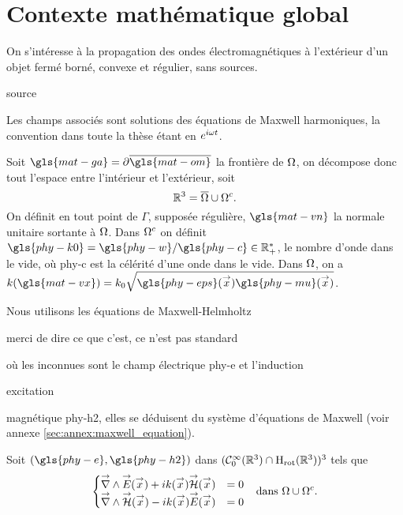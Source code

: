 \chapter{Contexte mathématique global}

\label{sec:context_math}
\minitoc
\newpage

On s’intéresse à la propagation des ondes électromagnétiques à l'extérieur d'un objet fermé borné, convexe et régulier, sans sources. 
\begin{REM}
  source
\end{REM}
Les champs associés sont solutions des équations de Maxwell harmoniques, la convention dans toute la thèse étant en \(e^{i\omega t}\). 

Soit \(\gls{mat-ga}=\partial\overline{\gls{mat-om}}\) la frontière de \(\Omega\), on décompose donc tout l'espace entre l'intérieur et l'extérieur, soit 
\[
\mathbb R^3 = \overline{\Omega}\cup{\Omega}^c.
\]
On définit en tout point de \(\Gamma\), supposée régulière, \(\gls{mat-vn}\) la normale unitaire sortante à \(\Omega\).
Dans \(\Omega^c\) on définit \(\gls{phy-k0}=\gls{phy-w} / \gls{phy-c} \in \RR_+^*\), le nombre d'onde dans le vide, où \gls{phy-c} 
est la célérité d'une onde dans le vide.
Dans \(\Omega\), on a \(k(\gls{mat-vx})=k_0\sqrt{\gls{phy-eps}(\vx)\gls{phy-mu}(\vx)}\).


Nous utilisons les équations de Maxwell-Helmholtz\begin{REM}
  merci de dire ce que c'est, ce n'est pas standard
\end{REM} où les inconnues sont le champ électrique \gls{phy-e} et l'induction \begin{REM}
  excitation
\end{REM} magnétique \gls{phy-h2}, elles se déduisent du système d'équations de Maxwell (voir annexe \ref{sec:annex:maxwell_equation}). 

Soit \((\gls{phy-e},\gls{phy-h2})\) dans \((\mathcal{C}_0^\infty(\mathbb R^3)\cap\mathrm{H}_\mathrm{rot}(\mathbb R^3))^3\) tels que
\begin{align}
  \left\lbrace
  \begin{matrix}
    {\overset{\rightarrow}{\nabla}}\wedge {\overset{\rightarrow}{E}}({\overset{\rightarrow}{x}}) + i k({\overset{\rightarrow}{x}}) {\overset{\rightarrow}{\mathcal{H}}}({\overset{\rightarrow}{x}}) &= 0
    \\
    {\overset{\rightarrow}{\nabla}}\wedge {\overset{\rightarrow}{\mathcal{H}}}({\overset{\rightarrow}{x}}) - i k({\overset{\rightarrow}{x}}) {\overset{\rightarrow}{E}}({\overset{\rightarrow}{x}}) &= 0
  \end{matrix}
  \right. && \text{dans \(\Omega\cup\Omega^c\).}
  \label{eq:unicite:maxwell_ext}
\end{align}

